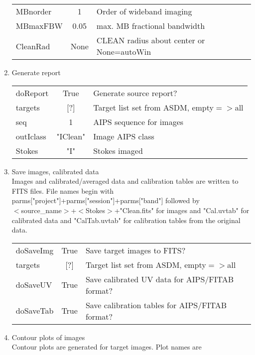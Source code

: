 \documentclass[11pt]{article}
\begin{document}
\begin{enumerate}
\begin{center}
\begin{tabular}{|l|c|l|}
MBnorder    & 1        & Order of wideband imaging \\
MBmaxFBW    & 0.05     & max. MB fractional bandwidth\\
CleanRad    & None     & CLEAN radius about center or None=autoWin\\
\hline
\end{tabular}
\end{center}
%
\newpage
\item Generate report\\
\begin{center}
\begin{tabular}{|l|c|l|}
\hline
doReport    & True     & Generate source report? \\
targets     & [?]      & Target list set from ASDM, empty$=>$all\\
seq         & 1        & AIPS sequence for images \\
outIclass   & "IClean" & Image AIPS class\\
Stokes      & "I"      & Stokes imaged \\
\hline
\end{tabular}
\end{center}
%
\item Save images, calibrated data\\
Images and calibrated/averaged data and calibration tables are written
to FITS files.
File names begin with \\
parms["project"]+parms["session"]+parms["band"]
followed by \\
$<$source\_name$>$+$<$Stokes$>$+"Clean.fits" for images and
"Cal.uvtab" for calibrated data and "CalTab.uvtab" for calibration
tables from the original data.
\begin{center}
\begin{tabular}{|l|c|l|}
\hline
doSaveImg & True &  Save target images to FITS?\\
targets   & [?]  & Target list set from ASDM, empty$=>$all\\
doSaveUV  & True & Save calibrated UV data for AIPS/FITAB format? \\
doSaveTab & True &  Save calibration tables for AIPS/FITAB format?\\
\hline
\end{tabular}
\end{center}
%
\item Contour plots of images\\
Contour plots are generated for target images.
Plot names are \\

\end{enumerate}
\end{document}
